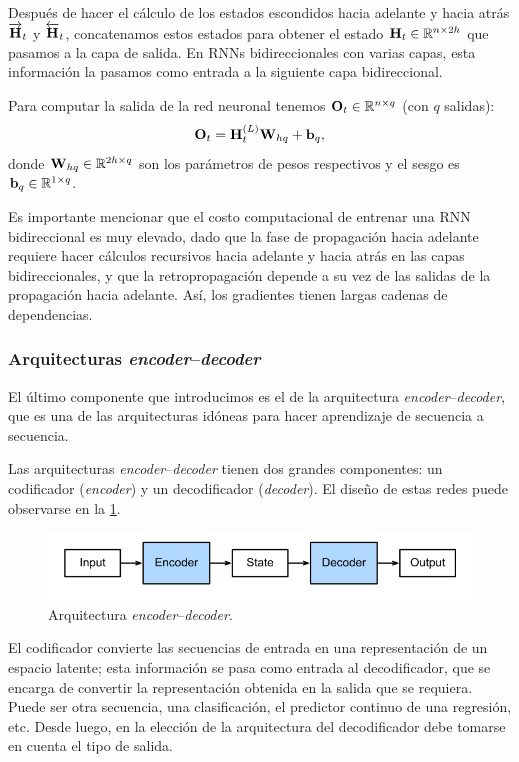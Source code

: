 \documentclass[12pt]{article}
\newcommand{\R}{\mathbb{R}}
\newcommand{\hi}{\bm{\textbf H}}
\newcommand{\we}{\bm{\textbf W}}
\newcommand{\bi}{\bm{\textbf b}}
\newcommand{\out}{\bm{\textbf O}}
\begin{document}
Después de hacer el cálculo de los estados escondidos hacia adelante y hacia atrás $ \overrightarrow{\hi}_t $ y $ \overleftarrow{\hi}_t $, concatenamos estos estados para obtener el estado $ \hi_t \in \R^{n \times 2h} $ que pasamos a la capa de salida. En RNNs bidireccionales con varias capas, esta información la pasamos como entrada a la siguiente capa bidireccional. 

Para computar la salida de la red neuronal tenemos $ \out_t \in \R^{n \times q} $ (con $ q $ salidas):
\begin{equation}
    \out_t = \hi_t^{(L)}\we_{hq} + \bi_q,
\end{equation}
donde $ \we_{hq} \in \R^{2h \times q} $ son los parámetros de pesos respectivos y el sesgo es $ \bi_q \in \R^{1 \times q} $.

Es importante mencionar que el costo computacional de entrenar una RNN bidireccional es muy elevado, dado que la fase de propagación hacia adelante requiere hacer cálculos recursivos hacia adelante y hacia atrás en las capas bidireccionales, y que la retropropagación depende a su vez de las salidas de la propagación hacia adelante. Así, los gradientes tienen largas cadenas de dependencias.

\subsubsection{Arquitecturas \textit{encoder}--\textit{decoder}}

El último componente que introducimos es el de la arquitectura \textit{encoder}--\textit{decoder}, que es una de las arquitecturas idóneas para hacer aprendizaje de secuencia a secuencia. 

Las arquitecturas \textit{encoder}--\textit{decoder} tienen dos grandes componentes: un codificador (\textit{encoder}) y un decodificador (\textit{decoder}). El diseño de estas redes puede observarse en la \cref{fig:encoder-decoder}.

\begin{figure}
    \centering
    \includegraphics[width=0.7\linewidth]{images/encoder-decoder}
    \caption{Arquitectura \textit{encoder}--\textit{decoder}.}
    \label{fig:encoder-decoder}
\end{figure}

El codificador convierte las secuencias de entrada en una representación de un espacio latente; esta información se pasa como entrada al decodificador, que se encarga de convertir la representación obtenida en la salida que se requiera. Puede ser otra secuencia, una clasificación, el predictor continuo de una regresión, etc. Desde luego, en la elección de la arquitectura del decodificador debe tomarse en cuenta el tipo de salida.
\end{document}
